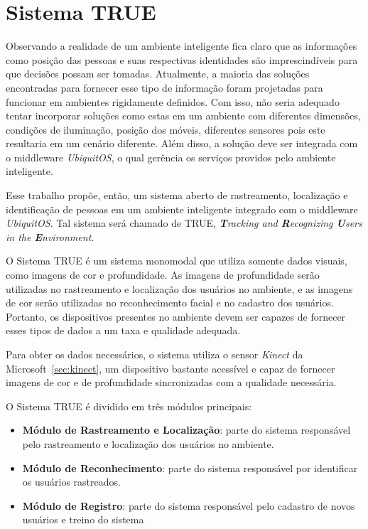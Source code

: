 \chapter{Sistema TRUE}

	Observando a realidade de um ambiente inteligente fica claro que as informações
	como posição das pessoas e suas respectivas identidades são imprescindíveis para
	que decisões possam ser tomadas. Atualmente, a maioria das soluções encontradas
	para fornecer esse tipo de informação foram projetadas para funcionar em
	ambientes rigidamente definidos. Com isso, não seria adequado tentar incorporar
	soluções como estas em um ambiente com diferentes dimensões, condições de
	iluminação, posição dos móveis, diferentes sensores pois este resultaria em um
	cenário diferente. Além disso, a solução deve ser integrada com o middleware
	\textit{UbiquitOS}, o qual gerência os serviços providos pelo ambiente
	inteligente.


	Esse trabalho propõe, então, um sistema aberto de rastreamento, localização e
	identificação de pessoas em um ambiente inteligente integrado com o middleware
	\textit{UbiquitOS}. Tal sistema será chamado de TRUE, \textit{\textbf{T}racking
	and \textbf{R}ecognizing \textbf{U}sers in the \textbf{E}nvironment}.

	O Sistema TRUE é um sistema monomodal que utiliza somente dados visuais, como
	imagens de cor e profundidade. As imagens de profundidade serão utilizadas no
	rastreamento e localização dos usuários no ambiente, e as imagens de cor serão
	utilizadas no reconhecimento facial e no cadastro dos usuários. Portanto, os
	dispositivos presentes no ambiente devem ser capazes de fornecer esses tipos de
	dados a um taxa e qualidade adequada.

	Para obter os dados necessários, o sistema utiliza o sensor \textit{Kinect} da
	Microsoft~\ref{sec:kinect}, um dispositivo bastante acessível e capaz de
	fornecer imagens de cor e de profundidade sincronizadas com a qualidade
	necessária.

	O Sistema TRUE é dividido em três módulos principais:

	\begin{itemize}
		\item \textbf{Módulo de Rastreamento e Localização}: parte do sistema responsável pelo rastreamento e localização dos usuários no ambiente.
		\item \textbf{Módulo de Reconhecimento}: parte do sistema responsável por identificar os usuários rastreados.
		\item \textbf{Módulo de Registro}: parte do sistema responsável pelo cadastro de novos usuários e treino do sistema
	\end{itemize}

